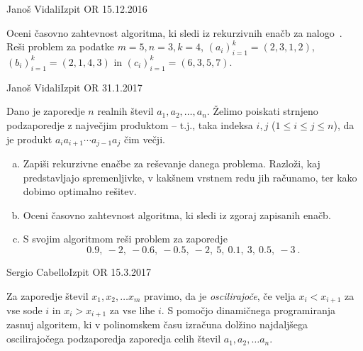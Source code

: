 \begin{naloga}{Janoš Vidali}{Izpit OR 15.12.2016}
\begin{vprasanje}
Oceni časovno zahtevnost algoritma,
ki sledi iz rekurzivnih enačb za nalogo~.
Reši problem za podatke $m = 5, n = 3, k = 4$,
$(a_i)_{i=1}^k = (2, 3, 1, 2)$, $(b_i)_{i=1}^k = (2, 1, 4, 3)$
in $(c_i)_{i=1}^k = (6, 3, 5, 7)$.
\end{vprasanje}
\begin{odgovor}
\end{odgovor}
\end{naloga}


\begin{naloga}{Janoš Vidali}{Izpit OR 31.1.2017}
\begin{vprasanje}
Dano je zaporedje $n$ realnih števil $a_1, a_2, \dots, a_n$.
Želimo poiskati strnjeno podzaporedje z največjim produktom
-- t.j., taka indeksa $i, j$ ($1 \le i \le j \le n$),
da je produkt $a_i a_{i+1} \cdots a_{j-1} a_j$ čim večji.

\begin{enumerate}[(a)]
\item Zapiši rekurzivne enačbe za reševanje danega problema.
Razloži, kaj predstavljajo spremenljivke,
v kakšnem vrstnem redu jih računamo,
ter kako dobimo optimalno rešitev.

\item Oceni časovno zahtevnost algoritma, ki sledi iz zgoraj zapisanih enačb.

\item S svojim algoritmom reši problem za zaporedje
$$
0.9, \ -2, \ -0.6, \ -0.5, \ -2, \ 5, \ 0.1, \ 3, \ 0.5, \ -3 \ .
$$
\end{enumerate}
\end{vprasanje}
\begin{odgovor}
\end{odgovor}
\end{naloga}


\begin{naloga}{Sergio Cabello}{Izpit OR 15.3.2017}
\begin{vprasanje}
Za zaporedje števil $x_1, x_2, \dots x_m$ pravimo, da je {\em oscilirajoče},
če velja $x_i < x_{i+1}$ za vse sode $i$ in $x_i > x_{i+1}$ za vse lihe $i$.
S pomočjo dinamičnega programiranja zasnuj algoritem,
ki v polinomskem času izračuna dolžino najdaljšega oscilirajočega podzaporedja
zaporedja celih števil $a_1, a_2, \dots a_n$.
\end{vprasanje}
\begin{odgovor}
\end{odgovor}
\end{naloga}


